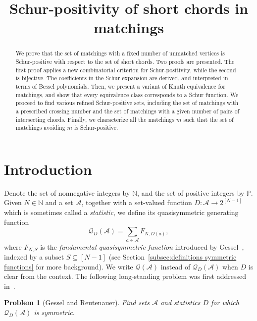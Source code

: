 \documentclass[ALCO]{cedram}
\title{Schur-positivity of short chords in matchings}
\author{\firstname{Avichai} \lastname{Marmor}}
\newcommand{\NN}{\mathbb{N}}
\newcommand{\PP}{\mathbb{P}}
\newcommand{\Q}{\mathcal{Q}}
\newcommand{\A}{\mathcal{A}}
\begin{document}
\newtheorem{observation}[cdrthm]{Observation}
\newtheorem{problem}[cdrthm]{Problem}
\newtheorem*{problem*}{Problem}

\begin{abstract}

We prove that the set of matchings with a fixed number of unmatched vertices is Schur-positive with respect to the set of short chords. 
Two proofs are presented. 
The first proof applies a new combinatorial criterion for Schur-positivity,  %
while the second is bijective. 
The coefficients in the Schur expansion are derived, 
and interpreted in terms of Bessel polynomials. 
Then, we present a variant of Knuth equivalence for matchings, and show that every equivalence class corresponds to a Schur function. We proceed to find various refined Schur-positive sets, including the set of matchings with a prescribed crossing number and the set of matchings with a given number of pairs of intersecting chords. 
Finally, we
characterize all the matchings $m$ such that the set of matchings avoiding $m$ is Schur-positive.
\end{abstract}

\maketitle
	

\section{Introduction}
\label{sec:introduction}

Denote the set of nonnegative integers by $\NN$, and the set of positive integers by $\PP$. Given $N\in \NN$ and a set $\A$, together with a set-valued function $D:\A\to 2^{[N-1]}$ which is sometimes called a \emph{statistic}, we define its quasisymmetric generating function
\[
    \Q_{D} (\A) = \sum_{a \in \A} F_{N, D(a)},
\]
where $F_{N, S}$ is the \emph{fundamental quasisymmetric function} introduced by Gessel~\cite{knuth_classes_schur_positive}, indexed by a subset $S \subseteq [N-1]$ (see Section~\ref{subsec:definitions symmetric functions} for more background). We write $\Q(\A)$ instead of $\Q_{D}(\A)$ when $D$ is clear from the context.
The following long-standing problem was first addressed in~\cite{gessel1993counting}.
\begin{problem}[Gessel and Reutenauer]
    Find sets $\A$ and statistics $D$ for which $\Q_{D}(\A)$ is symmetric.
\end{problem}
\end{document}
